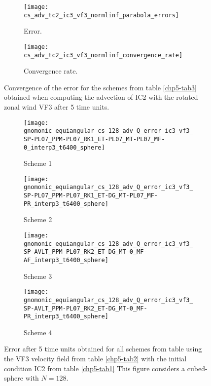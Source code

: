 \begin{figure}[!htb]
	\centering
	\begin{subfigure}{0.42\textwidth}
		\centering
		\texttt{[image: cs\_adv\_tc2\_ic3\_vf3\_normlinf\_parabola\_errors]}
		\caption{Error.\label{chp5-adv4-error}}
	\end{subfigure}
	\begin{subfigure}{0.42\textwidth}
		\centering
		\texttt{[image: cs\_adv\_tc2\_ic3\_vf3\_normlinf\_convergence\_rate]}
		\caption{Convergence rate.\label{chp5-adv4-cr}}
	\end{subfigure}
	\caption{Convergence of the error for the schemes from table \ref{chp5-tab3} obtained when computing the advection of IC2  with the rotated zonal wind VF3 after 5 time units.
		\label{chp5-error-adv4}}
\end{figure}


\begin{figure}[!htb]
	\centering
	\begin{subfigure}{0.35\textwidth}
		\centering
		\texttt{[image: gnomonic\_equiangular\_cs\_128\_adv\_Q\_error\_ic3\_vf3\_SP-PL07\_PPM-PL07\_RK1\_ET-PL07\_MT-PL07\_MF-0\_interp3\_t6400\_sphere]}
		\caption{Scheme 1 \label{chp5-adv4-s1}}
	\end{subfigure}
	\begin{subfigure}{0.35\textwidth}
		\centering
		\texttt{[image: gnomonic\_equiangular\_cs\_128\_adv\_Q\_error\_ic3\_vf3\_SP-PL07\_PPM-PL07\_RK1\_ET-DG\_MT-PL07\_MF-PR\_interp3\_t6400\_sphere]}
		\caption{Scheme 2 \label{chp5-adv4-s2}}
	\end{subfigure}
	
	\begin{subfigure}{0.35\textwidth}
		\centering
		\texttt{[image: gnomonic\_equiangular\_cs\_128\_adv\_Q\_error\_ic3\_vf3\_SP-AVLT\_PPM-PL07\_RK2\_ET-DG\_MT-0\_MF-AF\_interp3\_t6400\_sphere]}
		\caption{Scheme 3 \label{chp5-adv4-s3}}
	\end{subfigure}
	\begin{subfigure}{0.35\textwidth}
		\centering
		\texttt{[image: gnomonic\_equiangular\_cs\_128\_adv\_Q\_error\_ic3\_vf3\_SP-AVLT\_PPM-PL07\_RK2\_ET-DG\_MT-0\_MF-PR\_interp3\_t6400\_sphere]}
		\caption{Scheme 4 \label{chp5-adv4-s4}}
	\end{subfigure}
	\caption{ Error after 5 time units obtained for all schemes from table using the VF3 velocity field from table \ref{chp5-tab2} with the initial condition IC2 from  table \ref{chp5-tab1} 
		This figure considers a cubed-sphere with $N=128$. \label{chp5-adv4}}
\end{figure}


